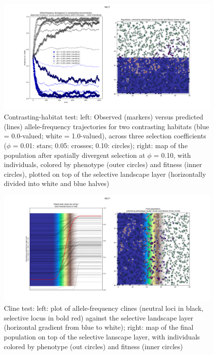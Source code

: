 ﻿\documentclass{article}
\begin{document}
\begin{figure}[h!]
\includegraphics[width=175mm]{./img/validation/divergence/divergence_test_ca1400_individuals_1000_timesteps.png}
        \caption{Contrasting-habitat test: left: Observed (markers) versus predicted (lines) allele-frequency trajectories for two contrasting habitats (blue = 0.0-valued; white = 1.0-valued), across three selection coefficients ($\phi$ = 0.01: stars; 0.05: crosses; 0.10: circles); right: map of the population after spatially divergent selection at $\phi$ = 0.10, with individuals, colored by phenotype (outer circles) and fitness (inner circles), plotted on top of the selective landscape layer (horizontally divided into white and blue halves)}
\end{figure}



\begin{figure}[h!]
\includegraphics[width=175mm]{./img/validation/cline/cline_adaptation_phi_0pt01_2500_timesteps.png}
        \caption{Cline test: left: plot of allele-frequency clines (neutral loci in black, selective locus in bold red) against the selective landscape layer (horizontal gradient from blue to white); right: map of the final population on top of the selective lanscape layer, with individuals colored by phenotype (out circles) and fitness (inner circles)}
\end{figure}
\end{document}

